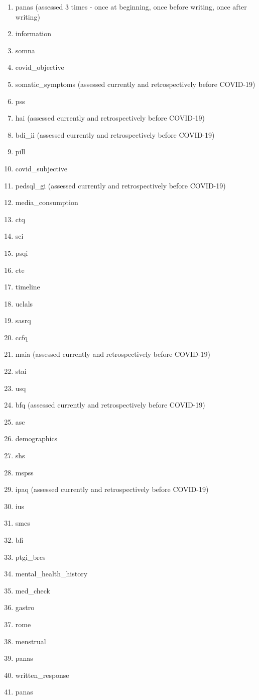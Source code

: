 \documentclass[]{book}
\providecommand{\tightlist}{%
  \setlength{\itemsep}{0pt}\setlength{\parskip}{0pt}}
\begin{document}
\begin{enumerate}
\def\labelenumi{\arabic{enumi}.}
\tightlist
\item
  panas (assessed 3 times - once at beginning, once before writing, once after writing)
\item
  information
\item
  somna
\item
  covid\_objective
\item
  somatic\_symptoms (assessed currently and retrospectively before COVID-19)
\item
  pss
\item
  hai (assessed currently and retrospectively before COVID-19)
\item
  bdi\_ii (assessed currently and retrospectively before COVID-19)
\item
  pill
\item
  covid\_subjective
\item
  pedsql\_gi (assessed currently and retrospectively before COVID-19)
\item
  media\_consumption
\item
  ctq
\item
  sci
\item
  psqi
\item
  cte
\item
  timeline
\item
  uclals
\item
  sasrq
\item
  ccfq
\item
  maia (assessed currently and retrospectively before COVID-19)
\item
  stai
\item
  usq
\item
  bfq (assessed currently and retrospectively before COVID-19)
\item
  asc
\item
  demographics
\item
  shs
\item
  mspss
\item
  ipaq (assessed currently and retrospectively before COVID-19)
\item
  ius
\item
  smcs
\item
  bfi
\item
  ptgi\_brcs
\item
  mental\_health\_history
\item
  med\_check
\item
  gastro
\item
  rome
\item
  menstrual
\item
  panas
\item
  written\_response
\item
  panas
\end{enumerate}
\end{document}
